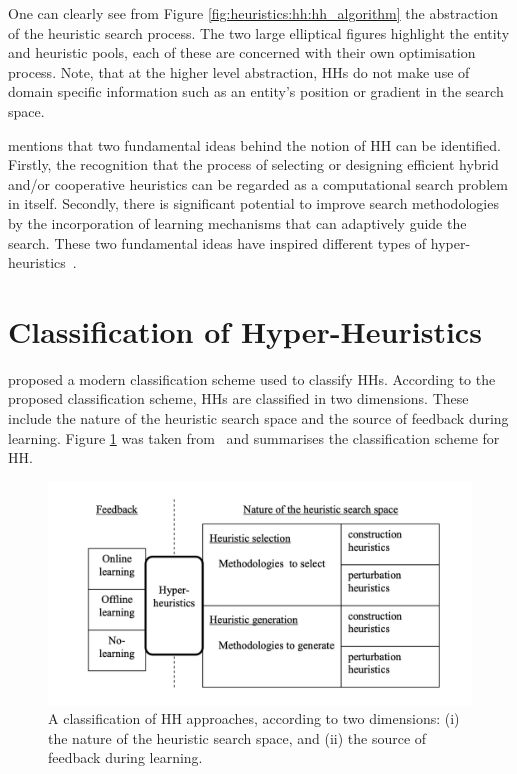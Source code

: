One can clearly see from Figure \ref{fig:heuristics:hh:hh_algorithm} the abstraction of the heuristic search process. The two large elliptical figures highlight the entity and heuristic pools, each of these are concerned with their own optimisation process. Note, that at the higher level abstraction, \acp{HH} do not make use of domain specific information such as an entity's position or gradient in the search space.

\citeauthor{ref:grobler:2015}\cite{ref:grobler:2015} mentions that two fundamental ideas behind the notion of \ac{HH} can be identified. Firstly, the recognition that the process of selecting or designing efficient hybrid and/or cooperative heuristics can be regarded as a computational search problem in itself. Secondly, there is significant potential to improve search methodologies by the incorporation of learning mechanisms that can adaptively guide the search. These two fundamental ideas have inspired different types of hyper-heuristics~\cite{ref:burke:2010}.


\section{Classification of Hyper-Heuristics}
\label{sec:hh:classification}

\citeauthor{ref:burke:2010}\cite{ref:burke:2010} proposed a modern classification scheme used to classify \acp{HH}. According to the proposed classification scheme, \acp{HH} are classified in two dimensions. These include the nature of the heuristic search space and the source of feedback during learning. Figure \ref{fig:heuristics:hh:classification} was taken from~\cite{ref:burke:2010} and summarises the classification scheme for \ac{HH}.

\begin{figure}[htbp]
      \includegraphics[width=\textwidth]{images/hh_classification.png}
      \caption{A classification of \ac{HH} approaches, according to two dimensions: (i) the nature of the heuristic search space, and (ii) the source of feedback during learning.}
      \label{fig:heuristics:hh:classification}
\end{figure}

